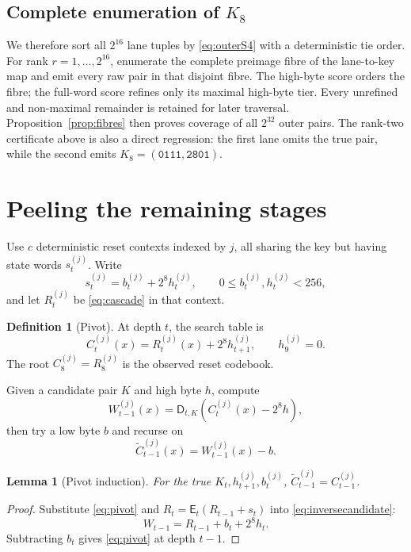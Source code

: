 \documentclass[10pt]{article}
\theoremstyle{plain}
\newtheorem{lemma}[theorem]{Lemma}
\theoremstyle{definition}
\newtheorem{definition}[theorem]{Definition}
\theoremstyle{remark}
\newcommand{\E}{\mathsf E}
\newcommand{\D}{\mathsf D}
\newcommand{\code}[1]{\texttt{#1}}
\begin{document}
\subsection{Complete enumeration of \(K_8\)}

We therefore sort all
\(2^{16}\) lane tuples by \eqref{eq:outerS4} with a deterministic tie order.
For rank \(r=1,\ldots,2^{16}\), enumerate the complete preimage fibre of the
lane-to-key map and emit every raw pair in that disjoint fibre.  The high-byte
score orders the fibre; the full-word score refines only its maximal
high-byte tier.  Every unrefined and non-maximal remainder is retained for
later traversal.  Proposition~\ref{prop:fibres} then proves coverage of all
\(2^{32}\) outer pairs.  The rank-two certificate above is also a direct
regression: the first lane omits the true pair, while the second emits
\(K_8=(\code{0111},\code{2801})\).

\section{Peeling the remaining stages}
\label{sec:inward}

Use \(c\) deterministic reset contexts indexed by \(j\), all sharing the key
but having state words \(s_t^{(j)}\).  Write
\[
s_t^{(j)}=b_t^{(j)}+2^8h_t^{(j)},\qquad0\leq b_t^{(j)},h_t^{(j)}<256,
\]
and let \(R_t^{(j)}\) be \eqref{eq:cascade} in that context.

\begin{definition}[Pivot]
At depth \(t\), the search table is
\begin{equation}
C_t^{(j)}(x)=R_t^{(j)}(x)+2^8h_{t+1}^{(j)},\qquad h_9^{(j)}=0.
\label{eq:pivot}
\end{equation}
The root \(C_8^{(j)}=R_8^{(j)}\) is the observed reset codebook.
\end{definition}

Given a candidate pair \(K\) and high byte \(h\), compute
\begin{equation}
W_{t-1}^{(j)}(x)=\D_{t,K}(C_t^{(j)}(x)-2^8h),
\label{eq:inversecandidate}
\end{equation}
then try a low byte \(b\) and recurse on
\begin{equation}
\widetilde C_{t-1}^{(j)}(x)=W_{t-1}^{(j)}(x)-b.
\label{eq:nextpivot}
\end{equation}

\begin{lemma}[Pivot induction]
\label{lem:pivot}
For the true \(K_t,h_{t+1}^{(j)},b_t^{(j)}\),
\(\widetilde C_{t-1}^{(j)}=C_{t-1}^{(j)}\).
\end{lemma}
\begin{proof}
Substitute \eqref{eq:pivot} and
\(R_t=\E_t(R_{t-1}+s_t)\) into \eqref{eq:inversecandidate}:
\[
W_{t-1}=R_{t-1}+b_t+2^8h_t.
\]
Subtracting \(b_t\) gives \eqref{eq:pivot} at depth \(t-1\).
\end{proof}
\end{document}
